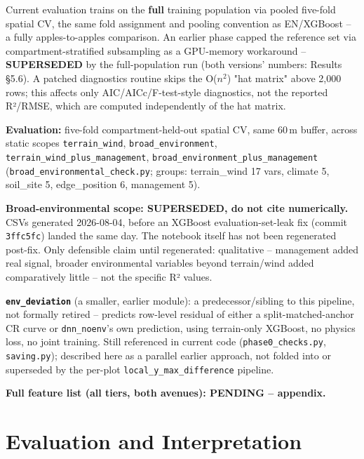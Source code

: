 Current evaluation trains on the \textbf{full} training population via pooled five-fold spatial CV,
the same fold assignment and pooling convention as EN/XGBoost -- a fully apples-to-apples
comparison. An earlier phase capped the reference set via compartment-stratified subsampling as a
GPU-memory workaround -- \textbf{SUPERSEDED} by the full-population run (both versions' numbers:
Results \S5.6). A patched diagnostics routine skips the O($n^2$) "hat matrix" above 2,000 rows;
this affects only AIC/AICc/F-test-style diagnostics, not the reported R²/RMSE, which are computed
independently of the hat matrix.

\textbf{Evaluation:} five-fold compartment-held-out spatial CV, same 60\,m buffer, across static
scopes \texttt{terrain\_wind}, \texttt{broad\_environment}, \texttt{terrain\_wind\_plus\_management},
\texttt{broad\_environment\_plus\_management} (\texttt{broad\_environmental\_check.py}; groups:
terrain\_wind 17 vars, climate 5, soil\_site 5, edge\_position 6, management 5).

\textbf{Broad-environmental scope: SUPERSEDED, do not cite numerically.} CSVs generated 2026-08-04,
before an XGBoost evaluation-set-leak fix (commit \texttt{3ffc5fc}) landed the same day. The
notebook itself has not been regenerated post-fix. Only defensible claim until regenerated:
qualitative -- management added real signal, broader environmental variables beyond terrain/wind
added comparatively little -- not the specific R² values.

\textbf{\texttt{env\_deviation}} (a smaller, earlier module): a predecessor/sibling to this
pipeline, not formally retired -- predicts row-level residual of either a split-matched-anchor CR
curve or \texttt{dnn\_noenv}'s own prediction, using terrain-only XGBoost, no physics loss, no
joint training. Still referenced in current code (\texttt{phase0\_checks.py}, \texttt{saving.py});
described here as a parallel earlier approach, not folded into or superseded by the per-plot
\texttt{local\_y\_max\_difference} pipeline.

\textbf{Full feature list (all tiers, both avenues): PENDING -- appendix.}

\section{Evaluation and Interpretation}

